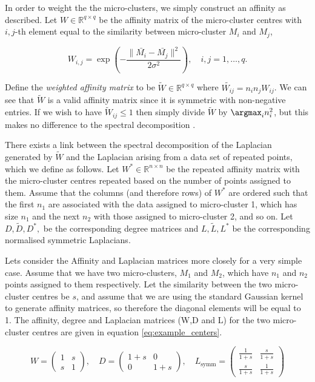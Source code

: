 In order to weight the the micro-clusters, we simply construct an affinity as described. 
Let $W \in \mathbb{R}^{q \times q}$ be the affinity matrix of the micro-cluster centres with $i,j$-th element equal to the similarity between micro-cluster $M_i$ and $M_j$, 

\[ W_{i,j} = \exp \left(- \frac{\| \bar{M_i} - \bar{M_j}\|^2}{2 \sigma^2} \right), \quad i, j = 1, \ldots, q. \]

Define the \textit{weighted affinity matrix} to be $\tilde{W} \in \mathbb{R}^{q \times q}$ where $ \tilde{W_{ij}} = n_in_jW_{ij}$. We can see that $\tilde{W}$ is a valid affinity matrix since it is symmetric with non-negative entries. If we wish to have $\tilde{W}_{ij} \leq 1$ then simply divide $\tilde{W}$ by $\argmax_i n_i^2$, but this makes no difference to the spectral decomposition \citep{Luxburg2008}. 

There exists a link between the spectral decomposition of  the Laplacian generated by $\tilde{W}$ and the Laplacian arising from a data set of repeated points, which we define as follows.  Let $W^* \in \mathbb{R}^{n \times n}$ be the repeated affinity matrix with the micro-cluster centres repeated based on the number of points assigned to them. Assume that the columns (and therefore rows) of $W^*$ are ordered such that the first $n_1$ are associated with the data assigned to micro-cluster 1, which has size $n_1$ and the next $n_2$ with those assigned to micro-cluster 2, and so on. Let $D, \tilde{D}, D^{*},$ be the corresponding degree matrices and $L, \tilde{L}, L^{*}$ be the corresponding normalised symmetric Laplacians.

Lets consider the Affinity and Laplacian matrices more closely for a very simple case. Assume that we have two micro-clusters, $M_1$ and $M_2$,  which have $n_1$ and $n_2$ points assigned to them respectively. Let the similarity between the two micro-cluster centres be $s$, and assume that we are using the standard Gaussian kernel to generate affinity matrices, so therefore the diagonal elements will be equal to 1. The affinity, degree and Laplacian matrices (W,D and L) for the two micro-cluster centres are given in equation \eqref{eq:example_centers}.

\begin{equation}
  \label{eq:example_centers}
 W = \left(
  \begin{array}{cc}
    1 & s \\
    s & 1
  \end{array} \right), \quad
%
 D = \left(
  \begin{array}{cc}
    1+s & 0 \\
    0 & 1+s
  \end{array} \right), \quad
%
 L_{\text{symm}} = \left(
  \begin{array}{cc}
    \frac{1}{1+s} & \frac{s}{1+s} \\
    \frac{s}{1+s} & \frac{1}{1+s} 
  \end{array} \right) 
\end{equation}

